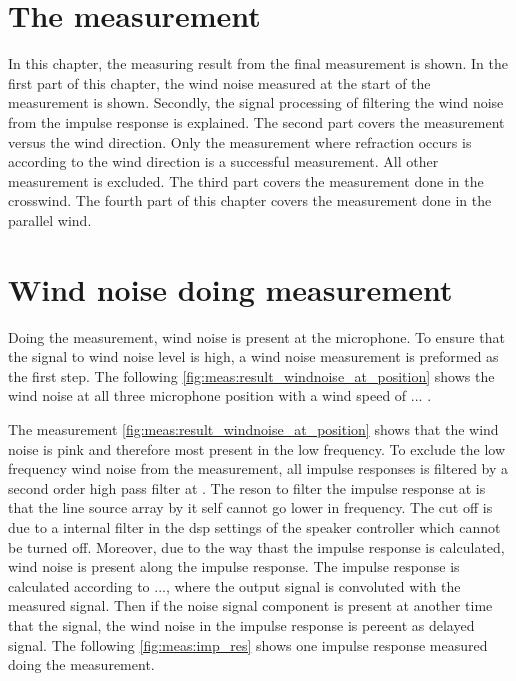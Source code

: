 \section{The measurement}\label{meas:meas_of_kudo}
In this chapter, the measuring result from the final measurement is shown. In the first part of this chapter, the wind noise measured at the start of the measurement is shown. Secondly, the signal processing of filtering the wind noise from the impulse response is explained. The second part covers the measurement versus the wind direction. Only the measurement where refraction occurs is according to the wind direction is a successful measurement. All other measurement is excluded. The third part covers the measurement done in the crosswind. The fourth part of this chapter covers the measurement done in the parallel wind. 


\section{Wind noise doing measurement}\label{mes:kudo:wind_noise}
Doing the measurement, wind noise is present at the microphone. To ensure that the signal to wind noise level is high, a wind noise measurement is preformed as the first step. The following \autoref{fig:meas:result_windnoise_at_position} shows the wind noise at all three microphone position with a wind speed of ... . 




The measurement \autoref{fig:meas:result_windnoise_at_position} shows that the wind noise is pink and therefore most present in the low frequency. To exclude the low frequency wind noise from the measurement, all impulse responses is filtered by a second order high pass filter at . The reson to filter the impulse response at  is that the line source array by it self cannot go lower in frequency. The cut off is due to a internal filter in the \gls{dsp} settings of the speaker controller which cannot be turned off. Moreover, due to the way thast the impulse response is calculated, wind noise is present along the impulse response. The impulse response is calculated according to ..., where the output signal is convoluted with the measured signal. Then if the noise signal component is present at another time that the signal, the wind noise in the impulse response is pereent as delayed signal. The following \autoref{fig:meas:imp_res} shows one impulse response measured doing the measurement.

